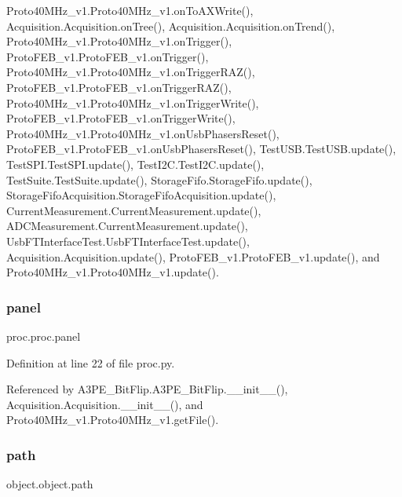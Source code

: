 Proto40\+M\+Hz\+\_\+v1.\+Proto40\+M\+Hz\+\_\+v1.\+on\+To\+A\+X\+Write(), Acquisition.\+Acquisition.\+on\+Tree(), Acquisition.\+Acquisition.\+on\+Trend(), Proto40\+M\+Hz\+\_\+v1.\+Proto40\+M\+Hz\+\_\+v1.\+on\+Trigger(), Proto\+F\+E\+B\+\_\+v1.\+Proto\+F\+E\+B\+\_\+v1.\+on\+Trigger(), Proto40\+M\+Hz\+\_\+v1.\+Proto40\+M\+Hz\+\_\+v1.\+on\+Trigger\+R\+A\+Z(), Proto\+F\+E\+B\+\_\+v1.\+Proto\+F\+E\+B\+\_\+v1.\+on\+Trigger\+R\+A\+Z(), Proto40\+M\+Hz\+\_\+v1.\+Proto40\+M\+Hz\+\_\+v1.\+on\+Trigger\+Write(), Proto\+F\+E\+B\+\_\+v1.\+Proto\+F\+E\+B\+\_\+v1.\+on\+Trigger\+Write(), Proto40\+M\+Hz\+\_\+v1.\+Proto40\+M\+Hz\+\_\+v1.\+on\+Usb\+Phasers\+Reset(), Proto\+F\+E\+B\+\_\+v1.\+Proto\+F\+E\+B\+\_\+v1.\+on\+Usb\+Phasers\+Reset(), Test\+U\+S\+B.\+Test\+U\+S\+B.\+update(), Test\+S\+P\+I.\+Test\+S\+P\+I.\+update(), Test\+I2\+C.\+Test\+I2\+C.\+update(), Test\+Suite.\+Test\+Suite.\+update(), Storage\+Fifo.\+Storage\+Fifo.\+update(), Storage\+Fifo\+Acquisition.\+Storage\+Fifo\+Acquisition.\+update(), Current\+Measurement.\+Current\+Measurement.\+update(), A\+D\+C\+Measurement.\+Current\+Measurement.\+update(), Usb\+F\+T\+Interface\+Test.\+Usb\+F\+T\+Interface\+Test.\+update(), Acquisition.\+Acquisition.\+update(), Proto\+F\+E\+B\+\_\+v1.\+Proto\+F\+E\+B\+\_\+v1.\+update(), and Proto40\+M\+Hz\+\_\+v1.\+Proto40\+M\+Hz\+\_\+v1.\+update().

\mbox{\label{classproc_1_1proc_a36068ce6d978f4f4dde164e7bdc2e057}} 
\subsubsection{\texorpdfstring{panel}{panel}}
{\footnotesize\ttfamily proc.\+proc.\+panel}



Definition at line 22 of file proc.\+py.



Referenced by A3\+P\+E\+\_\+\+Bit\+Flip.\+A3\+P\+E\+\_\+\+Bit\+Flip.\+\_\+\+\_\+init\+\_\+\+\_\+(), Acquisition.\+Acquisition.\+\_\+\+\_\+init\+\_\+\+\_\+(), and Proto40\+M\+Hz\+\_\+v1.\+Proto40\+M\+Hz\+\_\+v1.\+get\+File().

\mbox{\label{classobject_1_1object_a2a518f960961d791b0f900a90c3cd287}} 
\subsubsection{\texorpdfstring{path}{path}}
{\footnotesize\ttfamily object.\+object.\+path\hspace{0.3cm}{\ttfamily [inherited]}}




